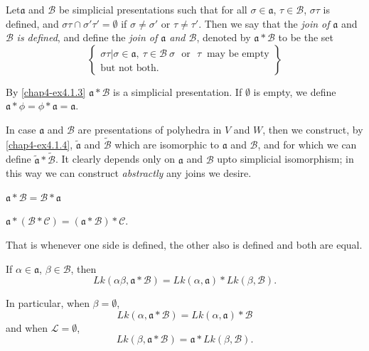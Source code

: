 \begin{definition}\label{chap4-defi4.1.9}
Let\pageoriginale $\mathfrak{a}$ and $\mathscr{B}$ be simplicial presentations such that for all $\sigma\in \mathfrak{a}$, $\tau\in\mathscr{B}$, $\sigma\tau$ is defined, and $\sigma\tau\cap \sigma'\tau'=\emptyset$ if $\sigma\neq \sigma'$ or $\tau\neq \tau'$. Then we say that the {\em join of} $\mathfrak{a}$ and $\mathscr{B}$ {\em is defined}, and define the {\em join of $\mathfrak{a}$ and $\mathscr{B}$}, denoted by $\mathfrak{a}\ast\mathscr{B}$ to be the set
$$
\left\{
\begin{array}{r}
\sigma\tau|\sigma\in\mathfrak{a},\ \tau\in \mathscr{B}\ \sigma\text{~ or~ }\tau~ \text{ may be empty}\\
\text{but not both.\ }
\end{array}
\right\}
$$

By \ref{chap4-ex4.1.3} $\mathfrak{a}\ast \mathscr{B}$ is a simplicial presentation. If $\emptyset$ is empty, we define $\mathfrak{a}\ast\phi=\phi\ast\mathfrak{a}=\mathfrak{a}$.
\end{definition}

In case $\mathfrak{a}$ and $\mathscr{B}$ are presentations of polyhedra in $V$ and $W$, then we construct, by \ref{chap4-ex4.1.4}, $\widetilde{\mathfrak{a}}$ and $\widetilde{\mathscr{B}}$ which are isomorphic to $\mathfrak{a}$ and $\mathscr{B}$, and for which we can define $\widetilde{\mathfrak{a}}\ast\widetilde{\mathscr{B}}$. It clearly depends only on $\mathfrak{a}$ and $\mathscr{B}$ upto simplicial isomorphism; in this way we can construct {\em abstractly} any joins we desire. 

\begin{ex}\label{chap4-ex4.1.10}
$\mathfrak{a}\ast\mathscr{B}=\mathscr{B}\ast\mathfrak{a}$

$\mathfrak{a}\ast(\mathscr{B}\ast\mathscr{C})=(\mathfrak{a}\ast\mathscr{B})\ast\mathscr{C}$. 

That is whenever one side is defined, the other also is defined and both are equal. 
\end{ex}

\begin{ex}\label{chap4-ex4.1.11}
If $\alpha\in\mathfrak{a}$, $\beta\in\mathscr{B}$, then
$$
Lk(\alpha\beta,\mathfrak{a}\ast\mathscr{B})=Lk(\alpha,\mathfrak{a})\ast Lk(\beta,\mathscr{B}). 
$$

In particular, when $\beta=\emptyset$,
$$
Lk(\alpha,\mathfrak{a}\ast\mathscr{B})=Lk(\alpha,\mathfrak{a})\ast\mathscr{B}
$$
and when $\mathscr{L}=\emptyset$,
$$
Lk(\beta,\mathfrak{a}\ast\mathscr{B})=\mathfrak{a}\ast Lk(\beta,\mathscr{B}).
$$
\end{ex}

